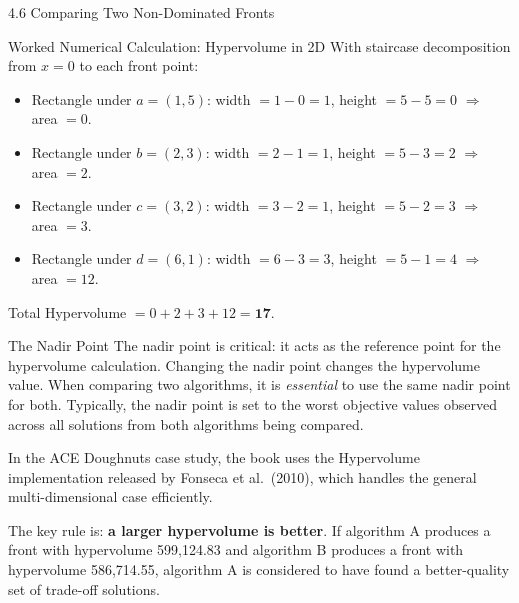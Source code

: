\documentclass[aspectratio=169,10pt]{beamer}
\begin{document}
\begin{frame}[allowframebreaks]{4.6 Comparing Two Non-Dominated Fronts}
\begin{exampleblock}{Worked Numerical Calculation: Hypervolume in 2D}
    \medskip
    With staircase decomposition from $x=0$ to each front point:

    \begin{itemize}
      \item Rectangle under $a=(1,5)$: width $= 1-0 = 1$,
            height $= 5 - 5 = 0$ $\Rightarrow$ area $= 0$.
      \item Rectangle under $b=(2,3)$: width $= 2-1 = 1$,
            height $= 5 - 3 = 2$ $\Rightarrow$ area $= 2$.
      \item Rectangle under $c=(3,2)$: width $= 3-2 = 1$,
            height $= 5 - 2 = 3$ $\Rightarrow$ area $= 3$.
      \item Rectangle under $d=(6,1)$: width $= 6-3 = 3$,
            height $= 5 - 1 = 4$ $\Rightarrow$ area $= 12$.
    \end{itemize}

    Total Hypervolume $= 0 + 2 + 3 + 12 = \mathbf{17}$.
  \end{exampleblock}

  \framebreak

  \begin{block}{The Nadir Point}
    The nadir point is critical: it acts as the reference point for the
    hypervolume calculation.  Changing the nadir point changes the hypervolume
    value.  When comparing two algorithms, it is \emph{essential} to use the
    same nadir point for both.  Typically, the nadir point is set to the worst
    objective values observed across all solutions from both algorithms being
    compared.
  \end{block}

  In the ACE Doughnuts case study, the book uses the Hypervolume implementation
  released by Fonseca et al.\ (2010), which handles the general multi-dimensional
  case efficiently.

  The key rule is: \textbf{a larger hypervolume is better}.  If algorithm A
  produces a front with hypervolume 599{,}124.83 and algorithm B produces a front
  with hypervolume 586{,}714.55, algorithm A is considered to have found a
  better-quality set of trade-off solutions.

  \framebreak


\end{frame}
\end{document}
